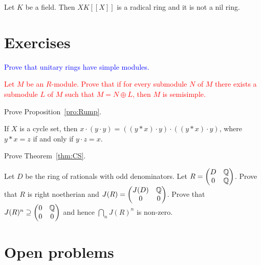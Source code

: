 \begin{example} 
Let $K$ be a field. Then $XK[\![X]\!]$ is a radical ring 
and it is not a nil ring.
\end{example}


\section{Exercises}

\begin{prob}
    \label{prob:Zorn_simple}
    \textcolor{blue}{Prove that unitary rings have simple modules.} 
\end{prob}
\begin{prob}
\textcolor{red}{Let $M$ be an $R$-module. Prove that if for every submodule $N$ of $M$ there exists a submodule $L$ of $M$ such that $M=N\oplus L$, then $M$ is semisimple.}
\end{prob}
\begin{prob}
	\label{prob:Rump}
	Prove Proposition~\ref{pro:Rump}. 
\end{prob}

\begin{prob}
	If $X$ is a cycle set, then $x\cdot (y\cdot y)=((y*x)\cdot y)\cdot ((y*x)\cdot y)$, where
	$y*x=z$ if and only if $y\cdot z=x$. 
\end{prob}

\begin{prob}
	\label{prob:CS}
	Prove Theorem~\ref{thm:CS}. 
\end{prob}

\begin{prob}
\label{prob:Herstein}
Let $D$ be the ring of rationals with odd denominators. Let
$R=\begin{pmatrix}
    D & \mathbb{Q}\\
    0 & \mathbb{Q}
\end{pmatrix}$. Prove that $R$ is right noetherian and 
$J(R)=\begin{pmatrix}
J(D) & \mathbb{Q}\\
0 & 0
\end{pmatrix}$. Prove that 
$J(R)^n\supseteq\begin{pmatrix}0&\mathbb{Q}\\0&0\end{pmatrix}$ and hence $\bigcap_nJ(R)^n$ is non-zero. 
\end{prob}

\section{Open problems}


